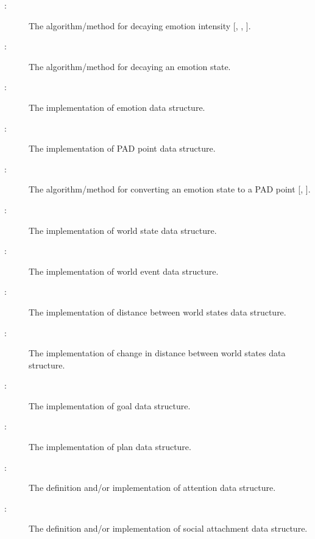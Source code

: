 \begin{description}
    \item[ \actheacnum \label{acDecayIntensityAlgo}:] The
    algorithm/method for decaying emotion intensity [,
    , ].

    \item[ \actheacnum \label{acDecayStateAlgo}:] The
    algorithm/method for decaying an emotion state.

    \item[ \actheacnum \label{acEmotionState}:] The
    implementation of emotion data structure.

    \item[ \actheacnum \label{acPADPointType}:] The
    implementation of PAD point data structure.

    \item[ \actheacnum \label{acState2PADAlgo}:] The
    algorithm/method for converting an emotion state to a PAD point
    [, ].

    \item[ \actheacnum \label{acWorldStateImpl}:] The
    implementation of world state data structure.

    \item[ \actheacnum \label{acWorldStateChangeImpl}:]
    The implementation of world event data structure.

    \item[ \actheacnum \label{acDistanceImpl}:] The
    implementation of distance between world states data structure.

    \item[ \actheacnum \label{acDistanceChangeImpl}:] The
    implementation of change in distance between world states data structure.

    \item[ \actheacnum \label{acGoalImpl}:] The
    implementation of goal data structure.

    \item[ \actheacnum \label{acPlanImpl}:] The
    implementation of plan data structure.

    \item[ \actheacnum \label{acAttentionImpl}:] The
    definition and/or implementation of attention data structure.

    \item[ \actheacnum \label{acAttachmentImpl}:] The
    definition and/or implementation of social attachment data structure.

\end{description}

